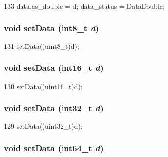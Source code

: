 \begin{DoxyCode}
133 { data.as_double = d; data_status = DataDouble; }
\end{DoxyCode}
\hypertarget{classTrace_1_1InstRecord_a0028137d8603f477e28f9869f9617937}{
\subsubsection[{setData}]{\setlength{\rightskip}{0pt plus 5cm}void setData (int8\_\-t {\em d})}}
\label{classTrace_1_1InstRecord_a0028137d8603f477e28f9869f9617937}



\begin{DoxyCode}
131 { setData((uint8_t)d); }
\end{DoxyCode}
\hypertarget{classTrace_1_1InstRecord_ad6c5a6b94b9bcb41af8fbf69bd96dd75}{
\subsubsection[{setData}]{\setlength{\rightskip}{0pt plus 5cm}void setData (int16\_\-t {\em d})}}
\label{classTrace_1_1InstRecord_ad6c5a6b94b9bcb41af8fbf69bd96dd75}



\begin{DoxyCode}
130 { setData((uint16_t)d); }
\end{DoxyCode}
\hypertarget{classTrace_1_1InstRecord_a0a9235e734de679667de04c586e8f5b8}{
\subsubsection[{setData}]{\setlength{\rightskip}{0pt plus 5cm}void setData (int32\_\-t {\em d})}}
\label{classTrace_1_1InstRecord_a0a9235e734de679667de04c586e8f5b8}



\begin{DoxyCode}
129 { setData((uint32_t)d); }
\end{DoxyCode}
\hypertarget{classTrace_1_1InstRecord_adda7b55a9bb38bf4027ec33e8bdc71bd}{
\subsubsection[{setData}]{\setlength{\rightskip}{0pt plus 5cm}void setData (int64\_\-t {\em d})}}
\label{classTrace_1_1InstRecord_adda7b55a9bb38bf4027ec33e8bdc71bd}



